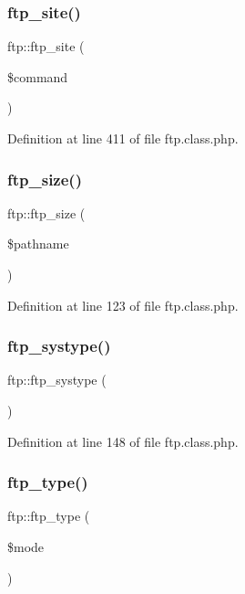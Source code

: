 \subsubsection{\texorpdfstring{ftp\+\_\+site()}{ftp\_site()}}
{\footnotesize\ttfamily ftp\+::ftp\+\_\+site (\begin{DoxyParamCaption}\item[{}]{\$command }\end{DoxyParamCaption})}



Definition at line 411 of file ftp.\+class.\+php.

\hypertarget{classftp_ac33a43d82a84e333224e5663eb298d82}{}\label{classftp_ac33a43d82a84e333224e5663eb298d82} 
\subsubsection{\texorpdfstring{ftp\+\_\+size()}{ftp\_size()}}
{\footnotesize\ttfamily ftp\+::ftp\+\_\+size (\begin{DoxyParamCaption}\item[{}]{\$pathname }\end{DoxyParamCaption})}



Definition at line 123 of file ftp.\+class.\+php.

\hypertarget{classftp_a4f41abd22a1239a475d49ec11a3618f4}{}\label{classftp_a4f41abd22a1239a475d49ec11a3618f4} 
\subsubsection{\texorpdfstring{ftp\+\_\+systype()}{ftp\_systype()}}
{\footnotesize\ttfamily ftp\+::ftp\+\_\+systype (\begin{DoxyParamCaption}{ }\end{DoxyParamCaption})}



Definition at line 148 of file ftp.\+class.\+php.

\hypertarget{classftp_ab8a20478b19800963c3a92762e78faa8}{}\label{classftp_ab8a20478b19800963c3a92762e78faa8} 
\subsubsection{\texorpdfstring{ftp\+\_\+type()}{ftp\_type()}}
{\footnotesize\ttfamily ftp\+::ftp\+\_\+type (\begin{DoxyParamCaption}\item[{}]{\$mode }\end{DoxyParamCaption})}



